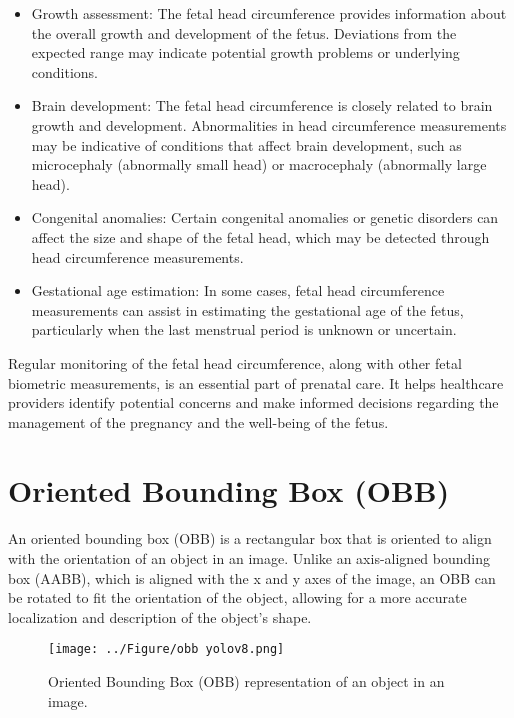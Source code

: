 \documentclass[14pt]{extreport}
\begin{document}
\begin{itemize}
    \item Growth assessment: The fetal head circumference provides information about the overall growth and development of the fetus. Deviations from the expected range may indicate potential growth problems or underlying conditions.
    \item Brain development: The fetal head circumference is closely related to brain growth and development. Abnormalities in head circumference measurements may be indicative of conditions that affect brain development, such as microcephaly (abnormally small head) or macrocephaly (abnormally large head).
    \item Congenital anomalies: Certain congenital anomalies or genetic disorders can affect the size and shape of the fetal head, which may be detected through head circumference measurements.
    \item Gestational age estimation: In some cases, fetal head circumference measurements can assist in estimating the gestational age of the fetus, particularly when the last menstrual period is unknown or uncertain.
\end{itemize}

Regular monitoring of the fetal head circumference, along with other fetal biometric measurements, is an essential part of prenatal care. It helps healthcare providers identify potential concerns and make informed decisions regarding the management of the pregnancy and the well-being of the fetus.

\section{Oriented Bounding Box (OBB)}

An oriented bounding box (OBB) is a rectangular box that is oriented to align with the orientation of an object in an image. Unlike an axis-aligned bounding box (AABB), which is aligned with the x and y axes of the image, an OBB can be rotated to fit the orientation of the object, allowing for a more accurate localization and description of the object's shape.

\begin{figure}[H]
    \centering
    \captionsetup{justification=centering, margin=2cm}
    \texttt{[image: ../Figure/obb yolov8.png]}
    \caption{Oriented Bounding Box (OBB) representation of an object in an image.}
    \label{fig:obb yolov8}
\end{figure}
\end{document}
